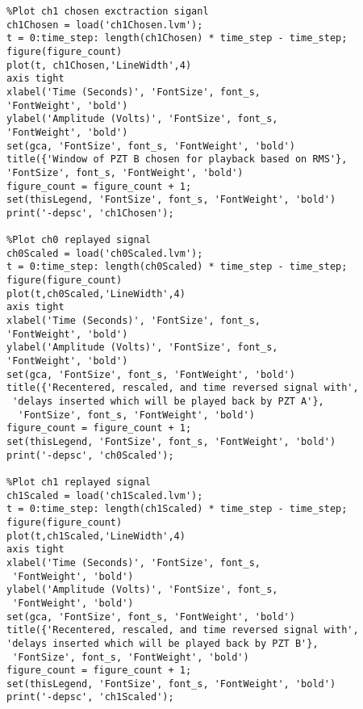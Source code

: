 \begin{lstlisting}
%Plot ch1 chosen exctraction siganl
ch1Chosen = load('ch1Chosen.lvm');
t = 0:time_step: length(ch1Chosen) * time_step - time_step;
figure(figure_count)
plot(t, ch1Chosen,'LineWidth',4)
axis tight
xlabel('Time (Seconds)', 'FontSize', font_s, 
'FontWeight', 'bold')
ylabel('Amplitude (Volts)', 'FontSize', font_s, 
'FontWeight', 'bold')
set(gca, 'FontSize', font_s, 'FontWeight', 'bold')
title({'Window of PZT B chosen for playback based on RMS'},
'FontSize', font_s, 'FontWeight', 'bold')
figure_count = figure_count + 1;
set(thisLegend, 'FontSize', font_s, 'FontWeight', 'bold')
print('-depsc', 'ch1Chosen');

%Plot ch0 replayed signal
ch0Scaled = load('ch0Scaled.lvm');
t = 0:time_step: length(ch0Scaled) * time_step - time_step;
figure(figure_count)
plot(t,ch0Scaled,'LineWidth',4)
axis tight
xlabel('Time (Seconds)', 'FontSize', font_s, 
'FontWeight', 'bold')
ylabel('Amplitude (Volts)', 'FontSize', font_s, 
'FontWeight', 'bold')
set(gca, 'FontSize', font_s, 'FontWeight', 'bold')
title({'Recentered, rescaled, and time reversed signal with',
 'delays inserted which will be played back by PZT A'},
  'FontSize', font_s, 'FontWeight', 'bold')
figure_count = figure_count + 1;
set(thisLegend, 'FontSize', font_s, 'FontWeight', 'bold')
print('-depsc', 'ch0Scaled');

%Plot ch1 replayed signal
ch1Scaled = load('ch1Scaled.lvm');
t = 0:time_step: length(ch1Scaled) * time_step - time_step;
figure(figure_count)
plot(t,ch1Scaled,'LineWidth',4)
axis tight
xlabel('Time (Seconds)', 'FontSize', font_s,
 'FontWeight', 'bold')
ylabel('Amplitude (Volts)', 'FontSize', font_s,
 'FontWeight', 'bold')
set(gca, 'FontSize', font_s, 'FontWeight', 'bold')
title({'Recentered, rescaled, and time reversed signal with', 
'delays inserted which will be played back by PZT B'},
 'FontSize', font_s, 'FontWeight', 'bold')
figure_count = figure_count + 1;
set(thisLegend, 'FontSize', font_s, 'FontWeight', 'bold')
print('-depsc', 'ch1Scaled');
\end{lstlisting}